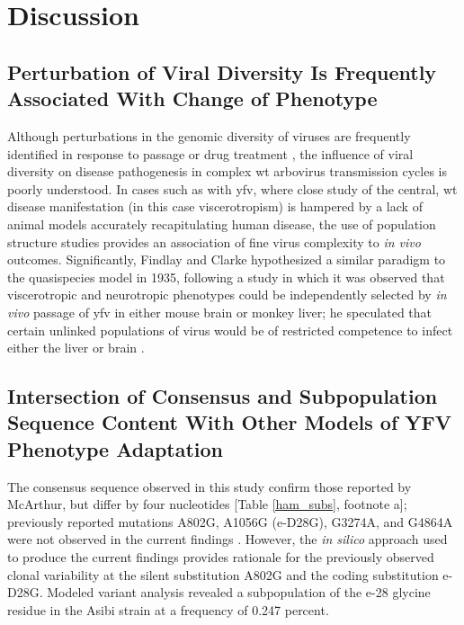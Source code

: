 \section{Discussion}
\subsection{Perturbation of Viral Diversity Is Frequently Associated With Change of Phenotype}
Although perturbations in the genomic diversity of viruses are frequently identified in response to passage or drug treatment \parencite{Nishijima:2012ew}, the influence of viral diversity on disease pathogenesis in complex \gls{wt} arbovirus transmission cycles is poorly understood. In cases such as with \gls{yfv}, where close study of the central, \gls{wt} disease manifestation (in this case viscerotropism) is hampered by a lack of animal models accurately recapitulating human disease, the use of population structure studies provides an association of fine virus complexity to \emph{in vivo} outcomes. Significantly, Findlay and Clarke hypothesized a similar paradigm to the quasispecies model in 1935, following a study in which it was observed that viscerotropic and neurotropic phenotypes could be independently selected by \emph{in vivo} passage of \gls{yfv} in either mouse brain or monkey liver; he speculated that certain unlinked populations of virus would be of restricted competence to infect either the liver or brain \parencite{FINDLAY:1935vu}.

\subsection{Intersection of Consensus and Subpopulation Sequence Content With Other Models of YFV Phenotype Adaptation}
The consensus sequence observed in this study confirm those reported by McArthur, but differ by four nucleotides [Table \ref{ham_subs}, footnote a]; previously reported mutations A802G, A1056G (\gls{e}-D28G), G3274A, and G4864A were not observed in the current findings \parencite{McArthur:2003fv}. However, the \emph{in silico} approach used to produce the current findings provides rationale for the previously observed clonal variability at the silent substitution A802G and the coding substitution \gls{e}-D28G. Modeled variant analysis revealed a subpopulation of the \gls{e}-28 glycine residue in the Asibi strain at a frequency of 0.247 percent. 

